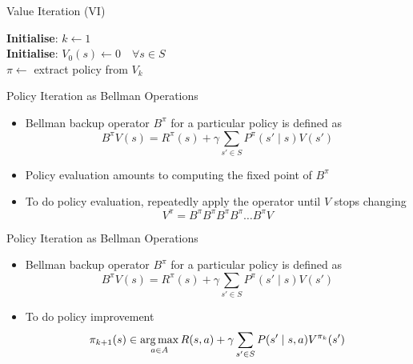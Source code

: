 \documentclass[aspectratio=169]{../latex_main/tntbeamer}  %
\begin{document}
\begin{frame}[c]{Value Iteration (VI)}

\begin{algorithm}[H]
    \caption{Value Iteration}
    \textbf{Initialise}: $k \gets 1$\\
    \textbf{Initialise}: $V_0(s) \gets 0 \quad \forall s \in S$\\
    $\pi \leftarrow$ extract policy from $V_k$
    
\end{algorithm}

\end{frame}
\begin{frame}[c]{Policy Iteration as Bellman Operations}

\begin{itemize}
	\item  Bellman backup operator $B^\pi$ for a particular policy is defined as
	$$ B^\pi V (s) = R^\pi (s) + \gamma \sum_{s' \in S}  P^\pi(s' \mid s ) V (s')  $$
	\item Policy evaluation amounts to computing the fixed point of $B^\pi$
	\item To do policy evaluation, repeatedly apply the operator until $V$ stops changing
	$$V^\pi = B^\pi B^\pi B^\pi B^\pi \ldots B^\pi V$$
	\end{itemize}

\end{frame}
\begin{frame}[c]{Policy Iteration as Bellman Operations}

\begin{itemize}
	\item  Bellman backup operator $B^\pi$ for a particular policy is defined as
	$$ B^\pi V (s) = R^\pi (s) + \gamma \sum_{s' \in S}  P^\pi(s' \mid s ) V (s')  $$
	\item To do policy improvement
	$$ \pi_{k+1} (s) \in \operatorname*{arg\,max}_{a \in A} R(s,a) + \gamma \sum_{s'\in S} P(s' \mid s,a) V^{\pi_{k}}(s')$$

\end{itemize}

\end{frame}
\end{document}
